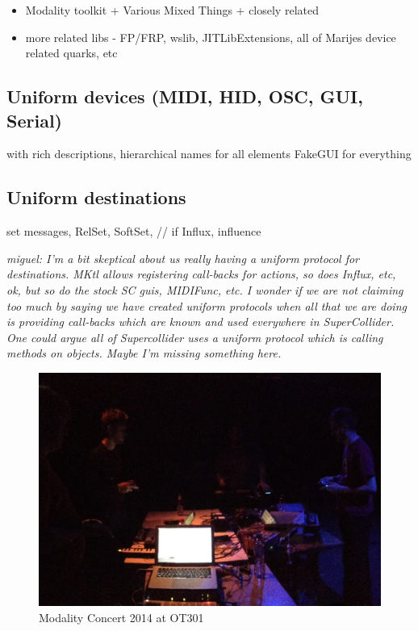 \documentclass{article}
\begin{document}
\begin{itemize}
	\item Modality toolkit + Various Mixed Things + closely related
	\item more related libs - FP/FRP, wslib, JITLibExtensions, 
		all of Marijes device related quarks, etc 
\end{itemize}

\subsection{ Uniform devices (MIDI, HID, OSC, GUI, Serial) }

		with rich descriptions, hierarchical names for all elements
		FakeGUI for everything


\subsection{ Uniform destinations}

		set messages, RelSet, SoftSet, // if Influx, influence

\emph{ miguel: I'm a bit skeptical about us really having a uniform protocol for destinations. MKtl allows registering call-backs for actions, so does Influx, etc, ok, but so do the stock SC guis, MIDIFunc, etc.  I wonder if we are not claiming too much by saying we have created uniform protocols when all that we are doing is providing call-backs which are known and used everywhere in SuperCollider. One could argue all of Supercollider uses a uniform protocol which is calling methods on objects. Maybe I'm missing something here.
}
 
		
\begin{figure}[h]
	\centering
		\includegraphics[width=.9\columnwidth]{../media/20140405-IMG_1691.jpg}
	\caption{Modality Concert 2014 at OT301}
	\label{fig:media_20140405-IMG_1691}
\end{figure}
\end{document}
